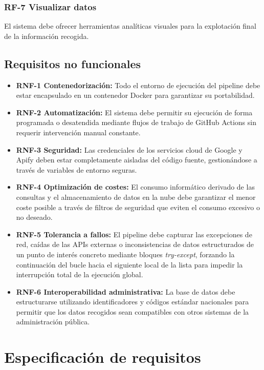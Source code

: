 \subsubsection{RF-7 Visualizar datos}
El sistema debe ofrecer herramientas analíticas visuales para la explotación final de la información recogida.

\subsection{Requisitos no funcionales}

\begin{itemize}
    \item \textbf{RNF-1 Contenedorización:} Todo el entorno de ejecución del pipeline debe estar encapsulado en un contenedor Docker para garantizar su portabilidad.
    \item \textbf{RNF-2 Automatización:} El sistema debe permitir su ejecución de forma programada o desatendida mediante flujos de trabajo de GitHub Actions sin requerir intervención manual constante.
    \item \textbf{RNF-3 Seguridad:} Las credenciales de los servicios cloud de Google y Apify deben estar completamente aisladas del código fuente, gestionándose a través de variables de entorno seguras.
    \item \textbf{RNF-4 Optimización de costes:} El consumo informático derivado de las consultas y el almacenamiento de datos en la nube debe garantizar el menor coste posible a través de filtros de seguridad que eviten el consumo excesivo o no deseado.
    \item \textbf{RNF-5 Tolerancia a fallos:} El pipeline debe capturar las excepciones de red, caídas de las APIs externas o inconsistencias de datos estructurados de un punto de interés concreto mediante bloques \textit{try-except}, forzando la continuación del bucle hacia el siguiente local de la lista para impedir la interrupción total de la ejecución global.
    \item \textbf{RNF-6 Interoperabilidad administrativa:} La base de datos debe estructurarse utilizando identificadores y códigos estándar nacionales para permitir que los datos recogidos sean compatibles con otros sistemas de la administración pública.
\end{itemize}


\section{Especificación de requisitos}

